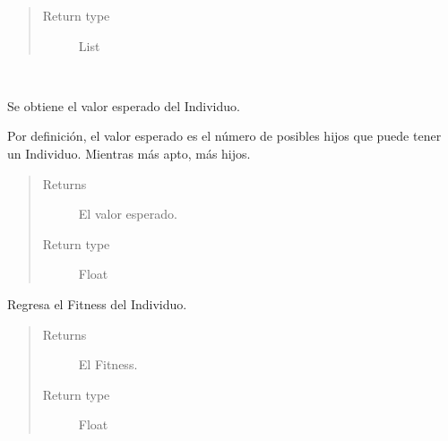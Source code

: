 \documentclass[letterpaper,10pt,english]{sphinxmanual}
\begin{document}
\begin{fulllineitems}
\begin{fulllineitems}
\begin{quote}
\begin{description}
\item[{Return type}] \leavevmode
List

\end{description}\end{quote}

\end{fulllineitems}


\begin{fulllineitems}
\label{Model/Community/Population/Individual/Individual:Model.Community.Population.Individual.Individual.Individual.get_expected_value}~
\begin{DUlineblock}{0em}
\item[] Se obtiene el valor esperado del Individuo.
\item[] Por definición, el valor esperado es el número de posibles
hijos que puede tener un Individuo. Mientras más apto, más 
hijos.
\end{DUlineblock}
\begin{quote}\begin{description}
\item[{Returns}] \leavevmode
El valor esperado.

\item[{Return type}] \leavevmode
Float

\end{description}\end{quote}

\end{fulllineitems}


\begin{fulllineitems}
\label{Model/Community/Population/Individual/Individual:Model.Community.Population.Individual.Individual.Individual.get_fitness}
Regresa el Fitness del Individuo.
\begin{quote}\begin{description}
\item[{Returns}] \leavevmode
El Fitness.

\item[{Return type}] \leavevmode
Float

\end{description}\end{quote}


\end{fulllineitems}
\end{fulllineitems}
\end{document}
